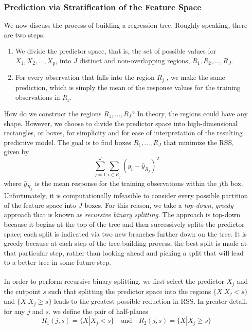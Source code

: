 \subsubsection{Prediction via Stratification of the Feature Space}
We now discuss the process of building a regression tree. Roughly speaking,
there are two steps.
\begin{enumerate}
    \item  We divide the predictor space, that is, the set of possible values for $X_1, X_2,...,X_p$, into $J$ distinct and non-overlapping regions, $R_1, R_2,...,R_J$.

    \item For every observation that falls into the region $R_j$ , we make the same prediction, which is simply the mean of the response values for the training observations in $R_j$.
\end{enumerate}
How do we construct the regions $R_1,...,R_J$? In theory, the regions could have any shape. However, we choose to divide the predictor space into high-dimensional rectangles, or boxes, for simplicity and for ease of interpretation of the resulting predictive model. The goal is to find boxes $R_1,...,R_J$ that minimize the RSS, given by
\begin{equation}
    \sum_{j=1}^J\sum_{i \in R_j}(y_i - \hat{y}_{R_j})^2
\end{equation}
where $\hat{y}_{R_j}$ is the mean response for the training observations within the $j$th box. Unfortunately, it is computationally infeasible to consider every
possible partition of the feature space into $J$ boxes. For this reason, we take
a \textit{top-down}, \textit{greedy} approach that is known as \textit{recursive binary splitting}. The approach is top-down because it begins at the top of the tree  and then successively splits the predictor space; each split is indicated via two new branches further down on the tree. It is greedy because at each step of the tree-building process, the best split is made at that particular step, rather than looking ahead and picking a split that will lead to a better tree in some future step.\\\\
In order to perform recursive binary splitting, we first select the predictor $X_j$ and the cutpoint $s$ such that splitting the predictor space into the regions $\{X|X_j < s\}$ and $\{X|X_j \geq s\}$ leads to the greatest possible
reduction in RSS. In greater detail, for any $j$ and $s$, we define the pair of half-planes
\[R_1(j,s) = \{X|X_j < s\} \quad \text{and} \quad R_2(j, s) = \{X|X_j \geq s\}\]
